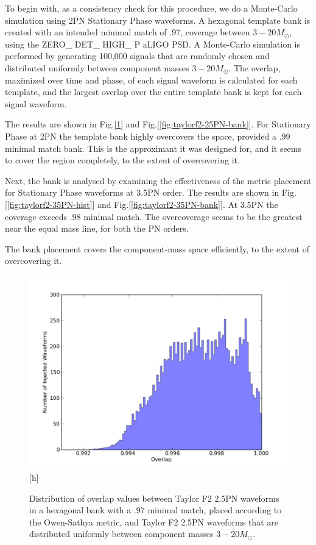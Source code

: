 \documentclass[aps,
prd,
amsmath,
amssymb,
twocolumn,
floatfix,
groupedaddress]{revtex4-1}
\begin{document}
To begin with, as a consistency check for this procedure, we do a Monte-Carlo simulation using 2PN Stationary Phase waveforms. A hexagonal template bank is created with an intended minimal match of .97, 
coverage between $3 -20 M_{\odot}$, using the ZERO\_ DET\_ HIGH\_ P aLIGO PSD. A Monte-Carlo simulation is performed by generating 100,000 signals that are randomly chosen and distributed uniformly between component masses $3 -20 M_{\odot}$. The overlap, maximized over time and phase, of each signal waveform is calculated for each template, and the largest overlap over the entire template bank is kept for each signal waveform. 

The results are shown in Fig.[\ref{fig:taylorf2-25PN-hist}] and Fig.[\ref{fig:taylorf2-25PN-bank}]. For Stationary Phase at 2PN the template bank highly overcovers the space, provided a .99 minimal match bank. This is the approximant it was designed for, and it seems to cover the region completely, to the extent of overcovering it. 

Next, the bank is analysed by examining the effectiveness of the metric placement for Stationary Phase waveforms at 3.5PN order. The results are shown in Fig.[\ref{fig:taylorf2-35PN-hist}] and Fig.[\ref{fig:taylorf2-35PN-bank}]. At 3.5PN the coverage exceeds .98 minimal match. The overcoverage seems to be the greatest near the equal mass line, for both the PN orders.

The bank placement covers the component-mass space efficiently, to the extent of overcovering it. 
\begin{figure}[h]
\includegraphics[scale=0.04, clip=false, totalheight=0.3\textheight]{taylorf2-2pn-hist.pdf}[h]
\caption{\label{fig:taylorf2-25PN-hist} Distribution of overlap values between Taylor F2 2.5PN waveforms
 in a hexagonal bank with a .97 minimal match, placed according to the Owen-Sathya metric, and Taylor F2 2.5PN
  waveforms that are distributed uniformly between component masses $3 -20 M_{\odot}$.}
\end{figure}
\end{document}
